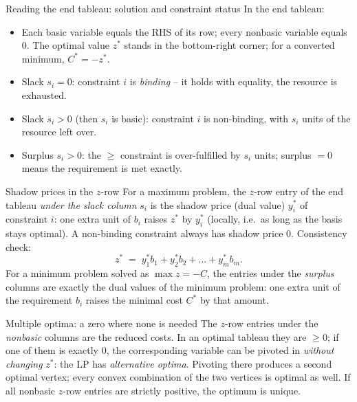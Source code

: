 \begin{rulebox}{Reading the end tableau: solution and constraint status}
In the end tableau:
\begin{itemize}[leftmargin=1.6em,itemsep=0.3ex]
  \item Each basic variable equals the RHS of its row; every nonbasic
        variable equals $0$. The optimal value $z^{*}$ stands in the
        bottom-right corner; for a converted minimum, $C^{*}=-z^{*}$.
  \item Slack $s_{i}=0$: constraint $i$ is \emph{binding} --
        it holds with equality, the resource is exhausted.
  \item Slack $s_{i}>0$ (then $s_{i}$ is basic): constraint $i$ is
        non-binding, with $s_{i}$ units of the resource left over.
  \item Surplus $s_{i}>0$: the $\ge$ constraint is over-fulfilled by
        $s_{i}$ units; surplus $=0$ means the requirement is met exactly.
\end{itemize}
\end{rulebox}

\begin{rulebox}{Shadow prices in the $z$-row}
For a maximum problem, the $z$-row entry of the end tableau \emph{under the
slack column} $s_{i}$ is the shadow price (dual value)
$y_{i}^{*}$ of constraint $i$: one extra unit of $b_{i}$ raises $z^{*}$ by
$y_{i}^{*}$ (locally, i.e.\ as long as the basis stays optimal). A
non-binding constraint always has shadow price $0$. Consistency check:
\[
  z^{*} \;=\; y_{1}^{*}b_{1}+y_{2}^{*}b_{2}+\dots+y_{m}^{*}b_{m}.
\]
For a minimum problem solved as $\max z=-C$, the entries under the
\emph{surplus} columns are exactly the dual values of the minimum problem:
one extra unit of the requirement $b_{i}$ raises the minimal cost $C^{*}$ by
that amount.
\end{rulebox}

\begin{rulebox}{Multiple optima: a zero where none is needed}
The $z$-row entries under the \emph{nonbasic} columns are the reduced costs. In an optimal tableau they are $\ge 0$; if one of
them is exactly $0$, the corresponding variable can be pivoted in
\emph{without changing} $z^{*}$: the LP has \emph{alternative optima}. Pivoting there produces a second optimal vertex;
every convex combination of the two vertices is optimal as well. If all
nonbasic $z$-row entries are strictly positive, the optimum is unique.
\end{rulebox}

